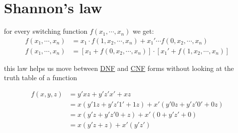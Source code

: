 \documentclass[a4paper,12pt]{article}
\begin{document}
\section{Shannon's law}
\label{sec:orgf6e4163}
\begin{definition}
for every switching function \(f(x_1, \cdots, x_n)\) we get:\\
\begin{align*}
  f(x_1, \cdots, x_n) &= x_1 \cdot f(1, x_2, \cdots, x_n) + x_1' \cdots f(0, x_2, \cdots, x_n)\\
  f(x_1, \cdots, x_n) &= [x_1 + f(0, x_2, \cdots, x_n)] \cdot [x_1' + f(1, x_2, \cdots, x_n)]
\end{align*}
\begin{characteristic}
this law helps us move between \hyperref[sec:org03ef0dd]{DNF} and \hyperref[sec:org51d7cda]{CNF} forms without looking at the truth table of a function\\
\end{characteristic}
\begin{my_example}
\begin{align*}
  f(x, y, z) &= y'xz + y'z'x' + xz\\
             &= x(y'1z + y'z'1' + 1z) + x'(y'0z + y'z'0' + 0z)\\
             &= x(y'z + y'z'0 + z) + x'(0 + y'z' + 0)\\
             &= x(y'z + z) + x'(y'z')
\end{align*}
\end{my_example}
\end{definition}
\end{document}
